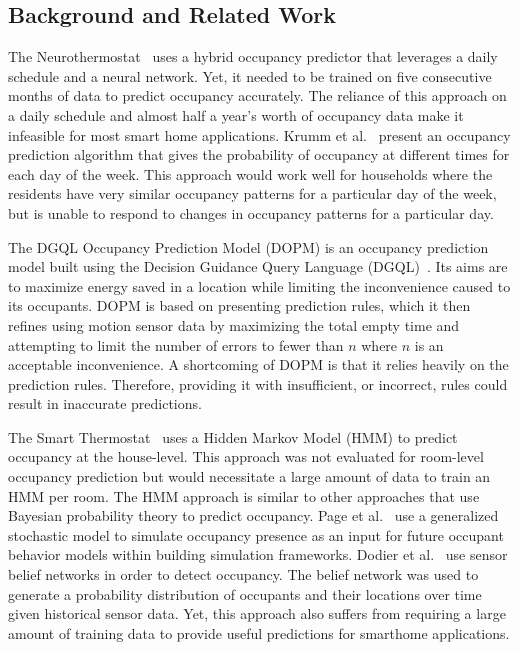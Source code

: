 \subsection{Background and Related Work}
\label{sec:occupancyBackground}


The Neurothermostat~\cite{mozer1997neurothermostat} uses a hybrid occupancy
predictor that leverages a daily schedule and a neural network. Yet, it needed
to be trained on five consecutive months of data to predict occupancy
accurately. The reliance of this approach on a daily schedule and almost half a
year's worth of occupancy data make it infeasible for most smart home
applications. Krumm et al.~\cite{krumm2011learning} present an occupancy
prediction algorithm that gives the probability of occupancy at different times
for each day of the week. This approach would work well for households where the
residents have very similar occupancy patterns for a particular day of the week,
but is unable to respond to changes in occupancy patterns for a particular day.

The DGQL Occupancy Prediction Model (DOPM) is an occupancy prediction model
built using the Decision Guidance Query Language (DGQL)~\cite{5718556}. Its aims
are to maximize energy saved in a location while limiting the inconvenience
caused to its occupants. DOPM is based on presenting prediction rules, which it
then refines using motion sensor data by maximizing the total empty time and
attempting to limit the number of errors to fewer than $n$ where $n$ is an
acceptable inconvenience. A shortcoming of DOPM is that it relies heavily on the
prediction rules. Therefore, providing it with insufficient, or incorrect, rules
could result in inaccurate predictions.

The Smart Thermostat~\cite{Lu2010} uses a Hidden Markov Model (HMM) to predict
occupancy at the house-level. This approach was not evaluated for room-level
occupancy prediction but would necessitate a large amount of data to train an
HMM per room. The HMM approach is similar to other approaches that use Bayesian
probability theory to predict occupancy. Page et al.~\cite{page2008generalised}
use a generalized stochastic model to simulate occupancy presence as an input
for future occupant behavior models within building simulation
frameworks. Dodier et al.~\cite{dodier2006building} use sensor belief networks
in order to detect occupancy. The belief network was used to generate a
probability distribution of occupants and their locations over time given
historical sensor data. Yet, this approach also suffers from requiring a large
amount of training data to provide useful predictions for smarthome
applications.

